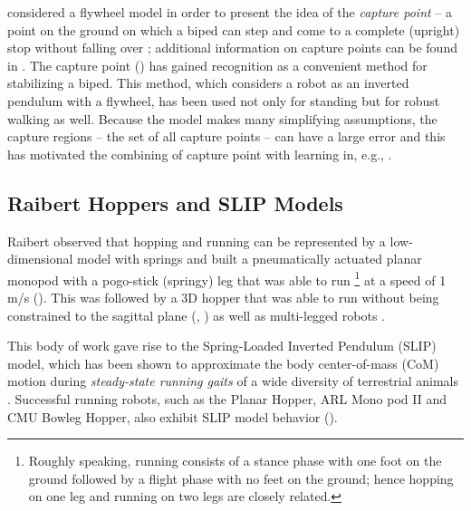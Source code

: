%
\cite{Pratt2006} considered a flywheel model in order to present the idea of the {\em capture point} -- a point on the ground on which a biped can step and come to a complete (upright) stop without falling over%
; additional information on capture points can be found in \cite{Koolen2012,Pratt2012}.
%
The capture point (\cite{Pratt2006a}) has gained recognition as a convenient method for stabilizing a biped.
%
%
This method, which considers a robot as an inverted pendulum with a flywheel, has been used not only for standing but for robust walking as well.
%
Because the model makes many simplifying assumptions, the capture regions -- the set of all capture points -- can have a large error and this has motivated the combining of capture point with learning in, e.g., \cite{Rebula2007}.

\subsection{Raibert Hoppers and SLIP Models}

Raibert observed that hopping and running can be represented by a low-dimensional model with springs and built a pneumatically actuated planar monopod with a pogo-stick (springy) leg that was able to run%
%
\footnote{Roughly speaking, running consists of a stance phase with one foot on the ground followed by a flight phase with no feet on the ground; hence hopping on one leg and running on two legs are closely related.}\xspace
%
at a speed of 1 m/s (\cite{Raibert1984,Raibert1984a,Raibert1986}).
%
This was followed by a 3D hopper that was able to run without being constrained to the sagittal plane (\cite[Chap.~3]{Raibert1986}, \cite{raibert:dbu}) as well as multi-legged robots \cite{Raibert1986a,Raibert1990,Hodgins1991}.
%

This body of work gave rise to the Spring-Loaded Inverted Pendulum (SLIP) model,
which has been shown to approximate the body center-of-mass (CoM) motion during
\textit{steady-state running gaits} of a wide diversity of terrestrial animals
\cite{Blickhan1989,Mcmahon1990,Farley1993,Full2000,Dickinson2000,Seyfarth2002}.
%
Successful running robots, such as the Planar Hopper, ARL Mono pod II and CMU Bowleg Hopper, also exhibit SLIP model behavior (\cite{Raibert1986,Zeglin1998,Ahmadi2006}).
%

